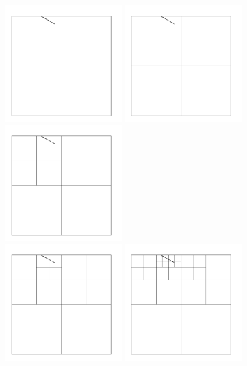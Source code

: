 
\noindent 
\includegraphics[width=4.5cm]{images/meshes/AMR/amr0}
\includegraphics[width=4.5cm]{images/meshes/AMR/amr1}
\includegraphics[width=4.5cm]{images/meshes/AMR/amr2}\\
\includegraphics[width=4.5cm]{images/meshes/AMR/amr3}
\includegraphics[width=4.5cm]{images/meshes/AMR/amr4}
